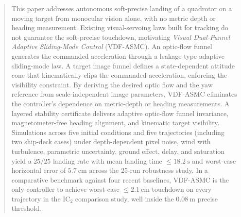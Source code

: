 \documentclass{IEEEtaes}
\begin{document}
\begin{abstract}This paper addresses autonomous soft-precise landing of a quadrotor on a moving target from monocular vision alone, with no metric depth or heading measurement. Existing visual-servoing laws built for tracking do not guarantee the soft-precise touchdown, motivating \emph{Visual Dual-Funnel Adaptive Sliding-Mode Control} (VDF-ASMC). An optic-flow funnel generates the commanded acceleration through a leakage-type adaptive sliding-mode law. A target image funnel defines a state-dependent attitude cone that kinematically clips the commanded acceleration, enforcing the visibility constraint. By deriving the desired optic flow and the yaw reference from scale-independent image parameters, VDF-ASMC eliminates the controller's dependence on metric-depth or heading measurements. A layered stability certificate delivers adaptive optic-flow funnel invariance, magnetometer-free heading alignment, and kinematic target visibility. Simulations across five initial conditions and five trajectories (including two ship-deck cases) under depth-dependent pixel noise, wind with turbulence, parametric uncertainty, ground effect, delay, and saturation yield a $25/25$ landing rate with mean landing time $\le 18.2~\text{s}$ and worst-case horizontal error of $5.7~\text{cm}$ across the 25-run robustness study. In a comparative benchmark against four recent baselines, VDF-ASMC is the only controller to achieve worst-case $\le 2.1~\text{cm}$ touchdown on every trajectory in the IC$_2$ comparison study, well inside the $0.08~\text{m}$ precise threshold.
\end{abstract}
\end{document}
